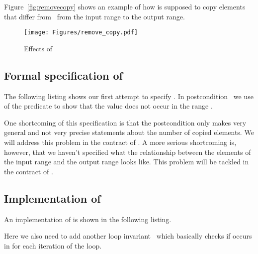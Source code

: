 Figure~\ref{fig:removecopy} shows an example of how \removecopy is supposed
to copy elements that differ from~ from the input range to the output range.

\begin{figure}[hbt]
\centering
\texttt{[image: Figures/remove\_copy.pdf]}
\caption{Effects of \removecopy}
\end{figure}

\FloatBarrier

\subsection{Formal specification of \removecopy}

The following listing shows our first attempt to specify \removecopy.
In postcondition~ we use of the predicate 
to show that the value  does not occur in the range .



One shortcoming of this specification is that the postcondition 
only makes very general and not very precise statements about the number of copied elements.
We will address this problem in the contract of .
A more serious shortcoming is, however, that we haven't specified what
the relationship between the elements of the input range 
and the output range  looks like.
This problem will be tackled in the contract of .


\subsection{Implementation of \removecopy}

An implementation of \removecopy is shown in the following listing.



Here we also need to add another loop invariant~ which basically 
checks if  occurs in  for each iteration of the loop.


